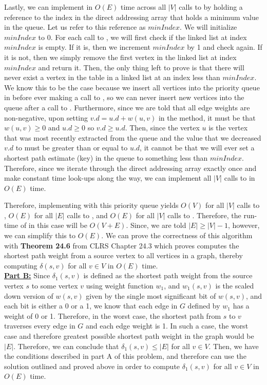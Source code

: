 \documentclass[11pt]{article}
\begin{document}
Lastly, we can implement  in $O(E)$ time across all $|V|$ calls to  by holding a reference to the index in the direct addressing array that holds a minimum value in the queue. Let us refer to this reference as $minIndex$. We will initialize $minIndex$ to 0. For each call to , we will first check if the linked list at index $minIndex$ is empty. If it is, then we increment $minIndex$ by 1 and check again. If it is not, then we simply remove the first vertex in the linked list at index $minIndex$ and return it. Then, the only thing left to prove is that there will never exist a vertex in the table in a linked list at an index less than $minIndex$. We know this to be the case because we insert all vertices into the priority queue in  before ever making a call to , so we can never insert new vertices into the queue after a call to . Furthermore, since we are told that all edge weights are non-negative, upon setting $v.d = u.d + w(u,v)$ in the  method, it must be that $w(u,v) \geq 0$ and $u.d \geq 0$ so $v.d \geq u.d$. Then, since the vertex $u$ is the vertex that was most recently extracted from the queue and the value that we decreased $v.d$ to must be greater than or equal to $u.d$, it cannot be that we will ever set a shortest path estimate (key) in the queue to something less than $minIndex$. Therefore, since we iterate through the direct addressing array exactly once and make constant time look-ups along the way, we can implement all $|V|$ calls to  in $O(E)$ time.

Therefore, implementing  with this priority queue yields $O(V)$ for all $|V|$ calls to , $O(E)$ for all $|E|$ calls to , and $O(E)$ for all $|V|$ calls to . Therefore, the run-time of  in this case will be $O(V+E)$. Since, we are told $|E| \geq |V| - 1$, however, we can simplify this to $O(E)$. We can prove the correctness of this algorithm with \textbf{Theorem 24.6} from CLRS Chapter 24.3 which proves  computes the shortest path weight from a source vertex to all vertices in a graph, thereby computing $\delta(s,v)$ for all $v \in V$ in $O(E)$ time.\\

\underline{\textbf{Part B:}} Since $\delta_1(s,v)$ is defined as the shortest path weight from the source vertex $s$ to some vertex $v$ using weight function $w_1$, and $w_1(s,v)$ is the scaled down version of $w(s,v)$ given by the single most significant bit of $w(s,v)$, and each bit is either a 0 or a 1, we know that each edge in $G$ defined by $w_1$ has a weight of 0 or 1. Therefore, in the worst case, the shortest path from $s$ to $v$ traverses every edge in $G$ and each edge weight is 1. In such a case, the worst case and therefore greatest possible shortest path weight in the graph would be $|E|$. Therefore, we can conclude that $\delta_1(s,v) \leq |E|$ for all $v \in V$. Then, we have the conditions described in part A of this problem, and therefore can use the solution outlined and proved above in order to compute $\delta_1(s,v)$ for all $v \in V$ in $O(E)$ time.\\
\end{document}
